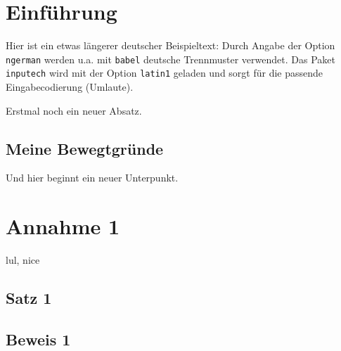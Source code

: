\documentclass[ngerman]{article}
\begin{document}
	\section{Einführung}
	Hier ist ein etwas längerer deutscher Beispieltext: Durch
	Angabe der Option \texttt{ngerman} werden u.a. mit \texttt{babel}
	deutsche Trennmuster verwendet. Das Paket \texttt{inputech} wird
	mit der Option \texttt{latin1} geladen und sorgt für die passende
	Eingabecodierung \scriptsize{(Umlaute)}\normalsize.
	
	Erstmal noch ein neuer Absatz.
	\subsection{Meine Bewegtgründe}
	Und hier beginnt ein neuer Unterpunkt.
	
	\section{Annahme 1}
	lul, nice
	\subsection{Satz 1}
	\subsection{Beweis 1}
	
\end{document}
